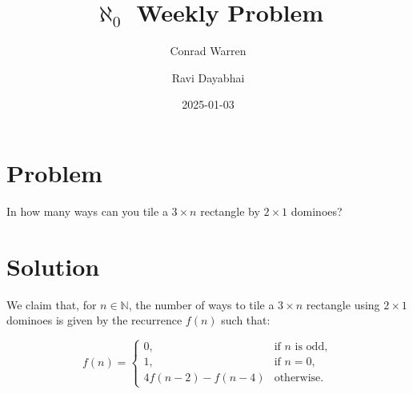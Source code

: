 \documentclass{article}
\title{$\aleph_{0}$ Weekly Problem}
\author{Conrad Warren \and Ravi Dayabhai}
\date{2025-01-03}
\begin{document}
\maketitle

\section*{Problem}

In how many ways can you tile a $3 \times n$ rectangle by $2 \times 1$ dominoes?

\section*{Solution}

We claim that, for $n \in \mathbb{N}$, the number of ways to tile a $3 \times n$ rectangle using $2 \times 1$ dominoes is given by the recurrence $f(n)$ such that:

$$
f(n) = 
\begin{cases}
    0, & \text{if } n\text{ is odd},\\
    1, & \text{if } n = 0,\\
    4f(n-2) - f(n-4) & \text{otherwise.}
\end{cases}
$$
\end{document}
